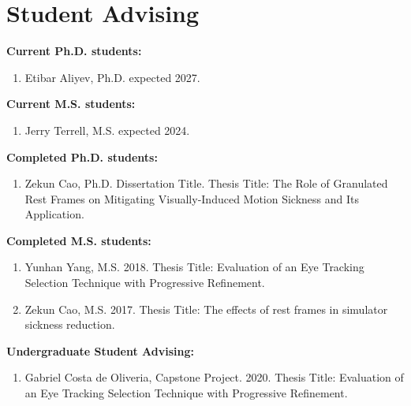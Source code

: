 \documentclass[wideaddress]{vitae}
\newcommand{\resitem}[1]{
	\item \begin{flushleft} #1 \end{flushleft}
}
\newenvironment{resnumberedlist}[1]{
	\resitem{\textbf{#1}}
	\begin{enumerate}
}{
	\end{enumerate}
}
\begin{document}
\section{Student Advising}
\begin{description}
	\begin{resnumberedlist}{Current Ph.D. students:}
	\resitem{Etibar Aliyev, Ph.D. expected 2027.}
	\end{resnumberedlist}

	\begin{resnumberedlist}{Current M.S. students:}
	\resitem{Jerry Terrell, M.S. expected 2024.}
	\end{resnumberedlist}

	\begin{resnumberedlist}{Completed Ph.D. students:}
	\resitem{Zekun Cao, Ph.D. Dissertation Title. Thesis Title: The Role of Granulated Rest Frames on Mitigating Visually-Induced Motion Sickness and Its Application.}
	\end{resnumberedlist}

	\begin{resnumberedlist}{Completed M.S. students:}
	\resitem{Yunhan Yang, M.S. 2018. Thesis Title: Evaluation of an Eye Tracking Selection Technique with Progressive Refinement.}
	\resitem{Zekun Cao, M.S. 2017. Thesis Title: The effects of rest frames in simulator sickness reduction.}
	\end{resnumberedlist}
	
	\begin{resnumberedlist}{Undergraduate Student Advising:}
	\resitem{Gabriel Costa de Oliveria, Capstone Project. 2020. Thesis Title: Evaluation of an Eye Tracking Selection Technique with Progressive Refinement.}
	\end{resnumberedlist}
	

\end{description}
\end{document}

